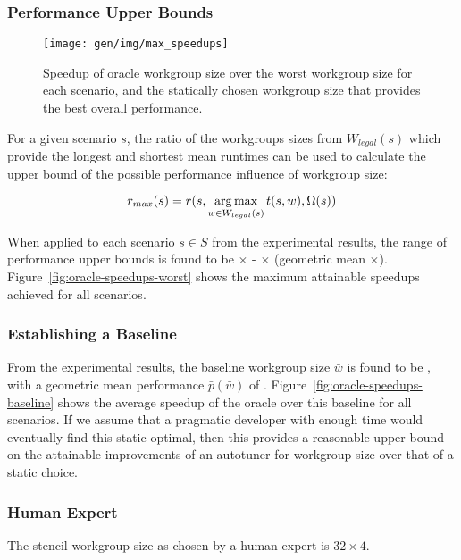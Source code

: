 \subsubsection{Performance Upper Bounds}

\begin{figure}
\texttt{[image: gen/img/max\_speedups]}
\caption{%
  Speedup of oracle workgroup size over the worst workgroup size for
  each scenario, and the statically chosen workgroup size that
  provides the best overall performance.%
}
\label{fig:speedups}
\end{figure}

For a given scenario $s$, the ratio of the workgroups sizes from
$W_{legal}(s)$ which provide the longest and shortest mean runtimes
can be used to calculate the upper bound of the possible performance
influence of workgroup size:

\begin{equation}
r_{max}(s) = r(s, \operatorname*{arg\,max}_{w \in W_{legal}(s)} t(s,w), \Omega(s))
\end{equation}

When applied to each scenario $s \in S$ from the experimental results,
the range of performance upper bounds is found to be
$\times$ -
$\times$ (geometric mean
$\times$). Figure~\ref{fig:oracle-speedups-worst}
shows the maximum attainable speedups achieved for all scenarios.


\subsubsection{Establishing a Baseline}

From the experimental results, the baseline workgroup size $\bar{w}$
is found to be , with a geometric mean performance
$\bar{p}(\bar{w})$ of
. Figure~\ref{fig:oracle-speedups-baseline}
shows the average speedup of the oracle over this baseline for all
scenarios. If we assume that a pragmatic developer with enough time
would eventually find this static optimal, then this provides a
reasonable upper bound on the attainable improvements of an autotuner
for workgroup size over that of a static choice.


\subsubsection{Human Expert}

The stencil workgroup size as chosen by a human expert is
$32 \times 4$.


